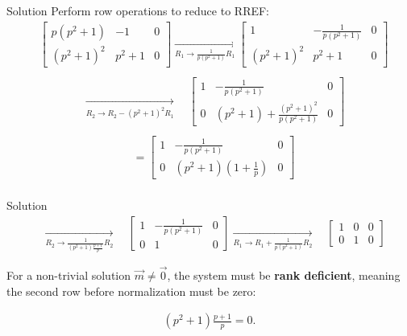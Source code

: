 \documentclass{beamer}
\begin{document}
\begin{frame}{Solution}
Perform row operations to reduce to RREF:
\begin{align}
& \left[
\begin{array}{cc|c}
p(p^2 + 1) & -1 & 0 \\
(p^2 + 1)^2 & p^2 + 1 & 0
\end{array}
\right]
\xrightarrow[R_1 \to \frac{1}{p(p^2+1)} R_1]{\quad}
\left[
\begin{array}{cc|c}
1 & -\frac{1}{p(p^2+1)} & 0 \\
(p^2 + 1)^2 & p^2 + 1 & 0
\end{array}
\right] \nonumber\\
\end{align}
\begin{align}
& \xrightarrow[R_2 \to R_2 - (p^2 + 1)^2 R_1]{\quad} 
 \quad
\left[
\begin{array}{cc|c}
1 & -\frac{1}{p(p^2+1)} & 0 \\
0 & (p^2 + 1) + \frac{(p^2 + 1)^2}{p(p^2+1)} & 0
\end{array}
\right] \nonumber\\
\end{align}
\begin{align}
&=
\left[
\begin{array}{cc|c}
1 & -\frac{1}{p(p^2+1)} & 0 \\
0 & (p^2 + 1)\left(1 + \frac{1}{p}\right) & 0
\end{array}
\right] \nonumber\\
\end{align}

\end{frame}


\begin{frame}{Solution}
\begin{align}
& \xrightarrow[R_2 \to \frac{1}{(p^2 + 1)\frac{p+1}{p}} R_2]{\quad} \quad
\left[
\begin{array}{cc|c}
1 & -\frac{1}{p(p^2+1)} & 0 \\
0 & 1 & 0
\end{array}
\right] 
 \xrightarrow[R_1 \to R_1 + \frac{1}{p(p^2+1)} R_2]{\quad} \quad
\left[
\begin{array}{cc|c}
1 & 0 & 0 \\
0 & 1 & 0
\end{array}
\right]
\end{align}

 For a non-trivial solution $\vec{m} \neq \vec{0}$, the system must be \textbf{rank deficient}, meaning the second row before normalization must be zero:
 
\begin{align}
(p^2 + 1) \frac{p + 1}{p} = 0.
\end{align}
\end{frame}
\end{document}
